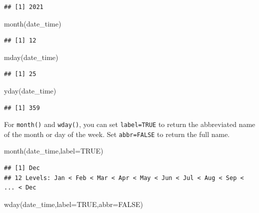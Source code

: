 \documentclass[
]{book}
\newenvironment{Shaded}{\begin{snugshade}}{\end{snugshade}}
\newcommand{\AttributeTok}[1]{\textcolor[rgb]{0.77,0.63,0.00}{#1}}
\newcommand{\ConstantTok}[1]{\textcolor[rgb]{0.00,0.00,0.00}{#1}}
\newcommand{\FunctionTok}[1]{\textcolor[rgb]{0.00,0.00,0.00}{#1}}
\newcommand{\NormalTok}[1]{#1}
\begin{document}
\begin{verbatim}
## [1] 2021
\end{verbatim}

\begin{Shaded}
\begin{Highlighting}[]
\FunctionTok{month}\NormalTok{(date\_time)}
\end{Highlighting}
\end{Shaded}

\begin{verbatim}
## [1] 12
\end{verbatim}

\begin{Shaded}
\begin{Highlighting}[]
\FunctionTok{mday}\NormalTok{(date\_time)}
\end{Highlighting}
\end{Shaded}

\begin{verbatim}
## [1] 25
\end{verbatim}

\begin{Shaded}
\begin{Highlighting}[]
\FunctionTok{yday}\NormalTok{(date\_time)}
\end{Highlighting}
\end{Shaded}

\begin{verbatim}
## [1] 359
\end{verbatim}

For \texttt{month()} and \texttt{wday()}, you can set \texttt{label=TRUE} to return the abbreviated name of the month or day of the week. Set \texttt{abbr=FALSE} to return the full name.

\begin{Shaded}
\begin{Highlighting}[]
\FunctionTok{month}\NormalTok{(date\_time,}\AttributeTok{label=}\ConstantTok{TRUE}\NormalTok{)}
\end{Highlighting}
\end{Shaded}

\begin{verbatim}
## [1] Dec
## 12 Levels: Jan < Feb < Mar < Apr < May < Jun < Jul < Aug < Sep < ... < Dec
\end{verbatim}

\begin{Shaded}
\begin{Highlighting}[]
\FunctionTok{wday}\NormalTok{(date\_time,}\AttributeTok{label=}\ConstantTok{TRUE}\NormalTok{,}\AttributeTok{abbr=}\ConstantTok{FALSE}\NormalTok{)}
\end{Highlighting}
\end{Shaded}
\end{document}
